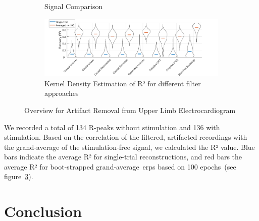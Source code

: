 \documentclass[a4paper]{article}
\newcommand{\figref}[1]{(see figure~\ref{#1})}
\begin{document}
\begin{figure}[hbtp]
\begin{subfigure}{.75\textwidth}
\begin{subfigure}{.45\textwidth}
        \end{subfigure}
    \caption{Signal Comparison}\label{fig:ecgRaw}
    \end{subfigure}
    \begin{subfigure}{1.0\textwidth}
        \includegraphics[width=\textwidth]{img/eva/ecg_R2.png}
        \caption{Kernel Density Estimation of R² for different filter approaches}\label{fig:ecgR2}
    \end{subfigure}
    \caption{Overview for Artifact Removal from Upper Limb Electrocardiogram}
\end{figure}

We recorded a total of 134 R-peaks without stimulation and 136 with stimulation. Based on  the correlation of the filtered, artifacted recordings with the grand-average of the stimulation-free signal, we calculated the R² value. Blue bars indicate the average R² for single-trial reconstructions, and red bars the average R² for boot-strapped grand-average~\gls{erp}s based on 100 epochs~\figref{fig:ecgR2}.

\section{Conclusion}



\end{document}
